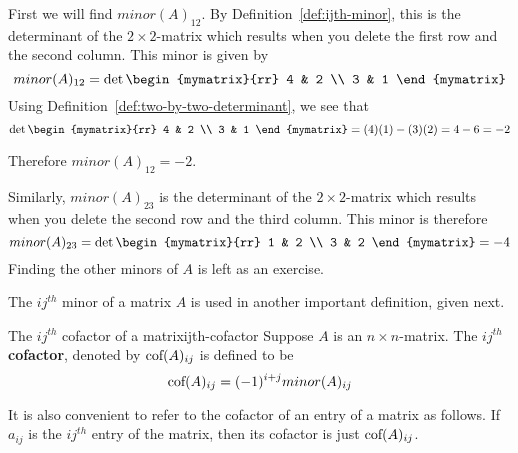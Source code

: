 \begin{solution}
  First we will find $minor(A) _{12}$. By
  Definition~\ref{def:ijth-minor}, this is the determinant of the
  $2\times 2$-matrix which results when you delete the first row and
  the second column. This minor is given by
  \begin{equation*}
    minor (A)_{12}
    =
    \det \begin{mymatrix}{rr}
      4 & 2 \\
      3 & 1
    \end{mymatrix}
  \end{equation*}
  Using Definition~\ref{def:two-by-two-determinant}, we see that
  \begin{equation*}
    \det \begin{mymatrix}{rr}
      4 & 2 \\
      3 & 1
    \end{mymatrix} = (4)(1) - (3)(2) = 4 - 6 = -2
  \end{equation*}

  Therefore $minor (A)_{12} = -2$. 

  Similarly, $minor(A)_{23}$ is the determinant of the
  $2\times 2$-matrix which results when you delete the second row and
  the third column. This minor is therefore
  \begin{equation*}
    minor (A)_{23} 
    =
    \det \begin{mymatrix}{rr}
      1 & 2 \\
      3 & 2
    \end{mymatrix} = -4
  \end{equation*}
  Finding the other minors of $A$ is left as an exercise.
\end{solution}

The $ij^{th}$ minor of a matrix $A$ is used in another important
definition, given next.

\begin{definition}{The $ij^{th}$ cofactor of a matrix}{ijth-cofactor}
  Suppose $A$ is an $n\times n$-matrix. The $ij^{th}$
  \textbf{cofactor}, denoted by
  $\mbox{\rm cof}(A) _{ij}$ is defined to be
  \begin{equation*}
    \mbox{\rm cof}(A) _{ij} = (-1) ^{i+j} minor(A)_{ij} 
  \end{equation*}
\end{definition}

It is also convenient to refer to the cofactor of an entry of a matrix
as follows. If $a_{ij}$ is the $ij^{th}$ entry of the matrix, then its
cofactor is just $\mbox{\rm cof}(A) _{ij}$.

